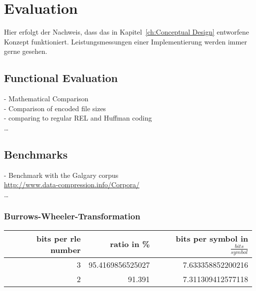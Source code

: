
\chapter{Evaluation}
\label{ch:Evaluation}
Hier erfolgt der Nachweis, dass das in Kapitel~\ref{ch:Conceptual Design}
entworfene Konzept funktioniert. 
Leistungsmessungen einer Implementierung werden immer gerne gesehen.

\section{Functional Evaluation}
\label{ch:Evaluation:sec:Functional Evaluation}
- Mathematical Comparison\\
- Comparison of encoded file sizes\\
- comparing to regular REL and Huffman coding\\
\ldots

\section{Benchmarks}
\label{ch:Evaluation:sec:Benchmarks}
- Benchmark with the Galgary corpus\\
\url{http://www.data-compression.info/Corpora/} \\
\ldots

\subsection{Burrows-Wheeler-Transformation}

\par{
\begin{center}
	\begin{tabular}[p]{r|r|r}
		\label{tab:t6 run length eval bwt}
		
		bits per rle number & ratio in \% & bits per symbol in $\frac{bits}{symbol}$\\
		\hline
		3 & 95.4169856525027 & 7.633358852200216\\
		2 & 91.391 & 7.311309412577118 \\
	\end{tabular}
\end{center}
}


